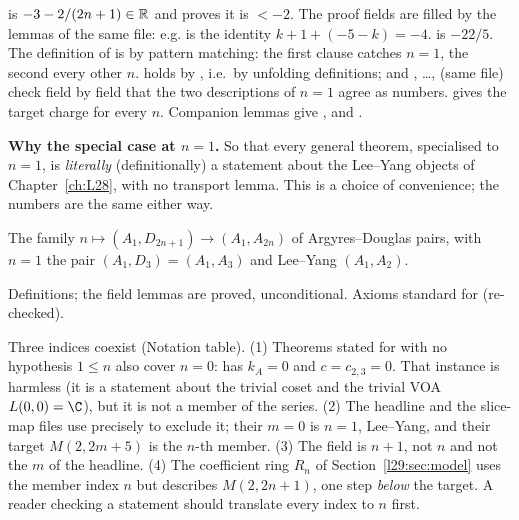 \begin{dictionary}
 is $-3-2/(2n+1)\in\mathbb{R}$ and  proves it is $<-2$. The proof fields are filled by
the lemmas of the same file: e.g.  is the identity $k+1+(-5-k)=-4$.  is
$-22/5$. The definition of  is by pattern matching: the first clause  catches
$n=1$, the second every other $n$.  holds by , i.e.\ by unfolding definitions; and
, \dots,  (same file) check field by field that the two descriptions
of $n=1$ agree as numbers.  gives the target charge for every $n$. Companion lemmas give
,  and .

\textbf{Why the special case at $n=1$.} So that every general theorem, specialised to $n=1$, is \emph{literally}
(definitionally) a statement about the Lee--Yang objects of Chapter~\ref{ch:L28}, with no transport lemma. This is a
choice of convenience; the numbers are the same either way.
\end{dictionary}

\begin{physics}
The family $n\mapsto(A_1,D_{2n+1})\to(A_1,A_{2n})$ of Argyres--Douglas pairs, with $n=1$ the pair $(A_1,D_3)=(A_1,A_3)$
and Lee--Yang $(A_1,A_2)$.
\end{physics}

\begin{status}
Definitions; the field lemmas are proved, unconditional. Axioms standard for  (re-checked).
\end{status}

\begin{warning}[title={Index conventions, and the member $n=0$}]\label{l29:warn:index}
Three indices coexist (Notation table). (1) Theorems stated for  with no hypothesis $1\le n$ also cover
$n=0$:  has $k_A=0$ and $c=c_{2,3}=0$. That instance is harmless (it is a statement about
the trivial coset and the trivial VOA $L(0,0)=\C$), but it is not a member of the series. (2) The headline and the
slice-map files use  precisely to exclude it; their $m=0$ is $n=1$, Lee--Yang, and their
target $M(2,2m+5)$ is the $n$-th member. (3) The field  is $n+1$, not $n$ and not the $m$ of the
headline. (4) The coefficient ring $R_n$ of Section~\ref{l29:sec:model} uses the member index $n$ but describes
$M(2,2n+1)$, one step \emph{below} the target. A reader checking a statement should translate every index to $n$
first.
\end{warning}

